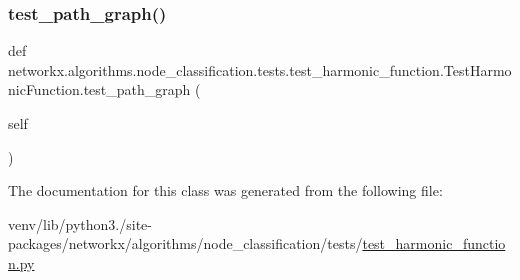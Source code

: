 \subsubsection{\texorpdfstring{test\+\_\+path\+\_\+graph()}{test\_path\_graph()}}
{\footnotesize\ttfamily def networkx.\+algorithms.\+node\+\_\+classification.\+tests.\+test\+\_\+harmonic\+\_\+function.\+Test\+Harmonic\+Function.\+test\+\_\+path\+\_\+graph (\begin{DoxyParamCaption}\item[{}]{self }\end{DoxyParamCaption})}



The documentation for this class was generated from the following file\+:\begin{DoxyCompactItemize}
\item 
venv/lib/python3./site-\/packages/networkx/algorithms/node\+\_\+classification/tests/\hyperlink{test__harmonic__function_8py}{test\+\_\+harmonic\+\_\+function.\+py}\end{DoxyCompactItemize}
